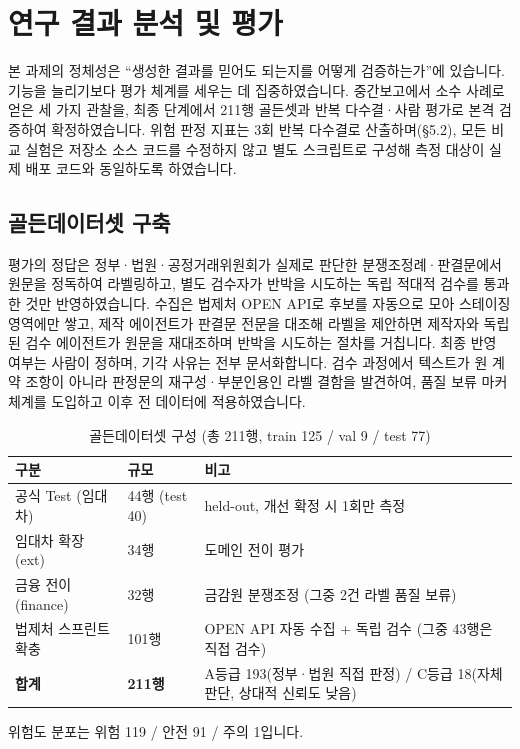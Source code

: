 \documentclass[10pt,a4paper]{article}
\newcommand{\tsz}{\fontsize{9.2}{12}\selectfont}
\begin{document}
\section{연구 결과 분석 및 평가}
본 과제의 정체성은 ``생성한 결과를 믿어도 되는지를 어떻게 검증하는가''에 있습니다. 기능을 늘리기보다 평가 체계를 세우는 데 집중하였습니다. 중간보고에서 소수 사례로 얻은 세 가지 관찰을, 최종 단계에서 211행 골든셋과 반복 다수결·사람 평가로 본격 검증하여 확정하였습니다. 위험 판정 지표는 3회 반복 다수결로 산출하며(\S5.2), 모든 비교 실험은 저장소 소스 코드를 수정하지 않고 별도 스크립트로 구성해 측정 대상이 실제 배포 코드와 동일하도록 하였습니다.

\subsection{골든데이터셋 구축}
평가의 정답은 정부·법원·공정거래위원회가 실제로 판단한 분쟁조정례·판결문에서 원문을 정독하여 라벨링하고, 별도 검수자가 반박을 시도하는 독립 적대적 검수를 통과한 것만 반영하였습니다. 수집은 법제처 OPEN API로 후보를 자동으로 모아 스테이징 영역에만 쌓고, 제작 에이전트가 판결문 전문을 대조해 라벨을 제안하면 제작자와 독립된 검수 에이전트가 원문을 재대조하며 반박을 시도하는 절차를 거칩니다. 최종 반영 여부는 사람이 정하며, 기각 사유는 전부 문서화합니다. 검수 과정에서 텍스트가 원 계약 조항이 아니라 판정문의 재구성·부분인용인 라벨 결함을 발견하여, 품질 보류 마커 체계를 도입하고 이후 전 데이터에 적용하였습니다.

\begin{table}[!htbp]\centering\tsz
\caption{골든데이터셋 구성 (총 211행, train 125 / val 9 / test 77)}\label{tab:golden}
\begin{tabularx}{0.9\textwidth}{L{3.6cm} L{2.6cm} Y}
\toprule
\textbf{구분} & \textbf{규모} & \textbf{비고}\\
\midrule
공식 Test (임대차) & 44행 (test 40) & held-out, 개선 확정 시 1회만 측정\\
임대차 확장(ext) & 34행 & 도메인 전이 평가\\
금융 전이(finance) & 32행 & 금감원 분쟁조정 (그중 2건 라벨 품질 보류)\\
법제처 스프린트 확충 & 101행 & OPEN API 자동 수집 + 독립 검수 (그중 43행은 직접 검수)\\
\midrule
\textbf{합계} & \textbf{211행} & A등급 193(정부·법원 직접 판정) / C등급 18(자체 판단, 상대적 신뢰도 낮음)\\
\bottomrule
\end{tabularx}
\end{table}
위험도 분포는 위험 119 / 안전 91 / 주의 1입니다.
\end{document}
